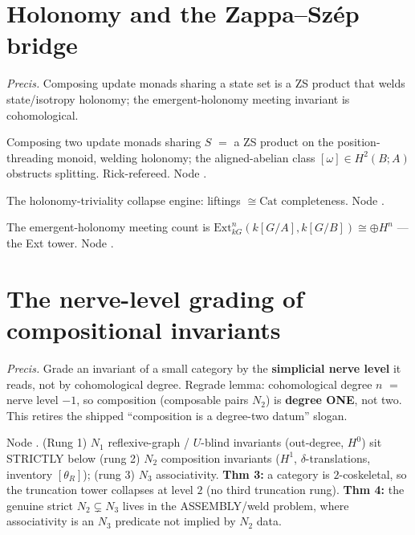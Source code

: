 \documentclass[11pt]{article}
\begin{document}
\section{Holonomy and the Zappa--Sz\'ep bridge}
\emph{Precis.} Composing update monads sharing a state set is a ZS product that welds
state/isotropy holonomy; the emergent-holonomy meeting invariant is cohomological.

\begin{theorem}
Composing two update monads sharing $S$ $=$ a ZS product on the position-threading monoid, welding
holonomy; the aligned-abelian class $[ω]\in H^2(B;A)$ obstructs splitting. Rick-refereed. Node
.
\end{theorem}

\begin{theorem}
The holonomy-triviality collapse engine: liftings $\cong\mathrm{Cat}$ completeness. Node
.
\end{theorem}

\begin{theorem}
The emergent-holonomy meeting count is $\mathrm{Ext}^n_{kG}(k[G/A],k[G/B])\cong\oplus H^n$ --- the
Ext tower. Node .
\end{theorem}

\section{The nerve-level grading of compositional invariants}
\emph{Precis.} Grade an invariant of a small category by the \textbf{simplicial nerve level} it
reads, not by cohomological degree. Regrade lemma: cohomological degree $n$ $=$ nerve level
$-1$, so composition (composable pairs $N_2$) is \textbf{degree ONE}, not two. This retires the
shipped ``composition is a degree-two datum'' slogan.

\begin{theorem}
Node . (Rung 1) $N_1$ reflexive-graph / $U$-blind invariants
(out-degree, $H^0$) sit STRICTLY below (rung 2) $N_2$ composition invariants ($H^1$,
$δ$-translations, inventory $[θ_R]$); (rung 3) $N_3$ associativity. \textbf{Thm 3:} a category is
$2$-coskeletal, so the truncation tower collapses at level $2$ (no third truncation rung).
\textbf{Thm 4:} the genuine strict $N_2\subsetneq N_3$ lives in the ASSEMBLY/weld problem, where
associativity is an $N_3$ predicate not implied by $N_2$ data.
\end{theorem}
\end{document}
